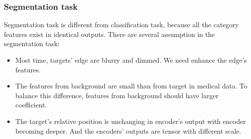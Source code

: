 \documentclass[journal]{IEEEtran}
\begin{document}
\subsubsection{Segmentation task}
Segmentation task is different from classification task, because all the category features exist in identical outputs. There are several assumption in the segmentation task:
\begin{itemize}
	\item Most time, targets' edge are blurry and dimmed. We need enhance the edge's features.
	\item The features from background are small than from target in medical data. To balance this difference, features from background should have larger coefficient.
	\item The target's relative position is unchanging in encoder's output with encoder becoming deeper. And the encoders' outputs are tensor with different scale.
\end{itemize}
\end{document}
